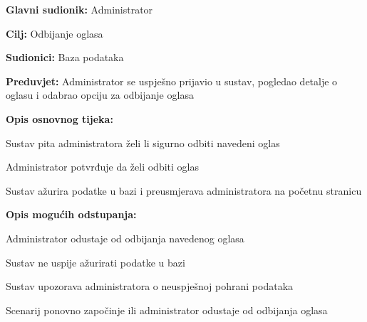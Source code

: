 					\begin{packed_item}
	
						\item \textbf{Glavni sudionik: }Administrator
						\item  \textbf{Cilj:} Odbijanje oglasa
						\item  \textbf{Sudionici:} Baza podataka
						\item  \textbf{Preduvjet:} Administrator se uspješno prijavio u sustav, pogledao detalje o oglasu i odabrao opciju za odbijanje oglasa
						\item  \textbf{Opis osnovnog tijeka:}
						
						\item[] \begin{packed_enum}
							\item Sustav pita administratora želi li sigurno odbiti navedeni oglas
							\item Administrator potvrđuje da želi odbiti oglas
							\item Sustav ažurira podatke u bazi i preusmjerava administratora na početnu stranicu
						\end{packed_enum}

						\item  \textbf{Opis mogućih odstupanja:}

						\item[] \begin{packed_item}
							\item[2.a] Administrator odustaje od odbijanja navedenog oglasa
							\item[3.a] Sustav ne uspije ažurirati podatke u bazi
							\item[] \begin{packed_enum}
								\item Sustav upozorava administratora o neuspješnoj pohrani podataka
								\item Scenarij ponovno započinje ili administrator odustaje od odbijanja oglasa
							\end{packed_enum}					
						\end{packed_item}
					\end{packed_item}

